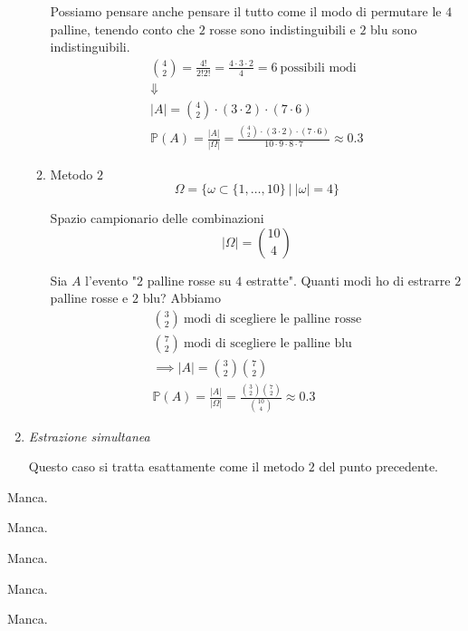 \begin{enumerate}
\begin{enumerate}
\begin{oss}
Possiamo pensare anche pensare il tutto come il modo di permutare le $4$ palline, tenendo conto che $2$ rosse sono indistinguibili e $2$ blu sono indistinguibili.\begin{gather*}
\binom{4}{2} =\frac{4!}{2!2!} =\frac{4\cdot 3\cdot 2}{4} =6\ \text{possibili modi}\\
\Downarrow \\
| A| =\binom{4}{2} \cdot ( 3\cdot 2) \cdot ( 7\cdot 6)\\
\mathbb{P}( A) =\frac{| A| }{| \Omega | } =\frac{\binom{4}{2} \cdot ( 3\cdot 2) \cdot ( 7\cdot 6)}{10\cdot 9\cdot 8\cdot 7} \approx 0.3
\end{gather*}
\end{oss}
\item Metodo $2$\begin{equation*}
\Omega =\{\omega \subset \{1,\dots ,10\} \ |\ | \omega | =4\}
\end{equation*}

Spazio campionario delle combinazioni\begin{equation*}
| \Omega | =\binom{10}{4}
\end{equation*}

Sia $A$ l'evento "$2$ palline rosse su $4$ estratte". Quanti modi ho di estrarre $2$ palline rosse e $2$ blu? Abbiamo\begin{gather*}
\binom{3}{2} \ \text{modi di scegliere le palline rosse}\\
\binom{7}{2} \ \text{modi di scegliere le palline blu}\\
\implies | A| =\binom{3}{2}\binom{7}{2}\\
\mathbb{P}( A) =\frac{| A| }{| \Omega | } =\frac{\binom{3}{2}\binom{7}{2}}{\binom{10}{4}} \approx 0.3
\end{gather*}
\end{enumerate}
\item \textit{Estrazione simultanea}

Questo caso si tratta esattamente come il metodo $2$ del punto precedente.
\end{enumerate}
\Soluzione

Manca.
\Soluzione

Manca.
\Soluzione

Manca.
\Soluzione

Manca.
\Soluzione

Manca.
\Soluzione

